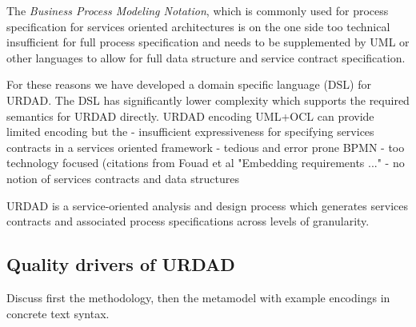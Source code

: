 The \emph{Business Process Modeling Notation}, which is commonly used for process specification for services oriented architectures is on the one side too technical \cite{} insufficient for full process specification and needs to be supplemented by UML or other languages to allow for full data structure and service contract specification.


For these reasons we have developed a domain specific language (DSL) for URDAD. The DSL has significantly lower complexity which supports the required semantics for URDAD directly. 
URDAD encoding
UML+OCL can provide limited encoding but the
  - insufficient expressiveness for specifying services contracts in a services oriented framework
  - tedious and error prone
BPMN
  - too technology focused (citations from Fouad et al "Embedding requirements ..."
  - no notion of services contracts and data structures  

URDAD is a service-oriented analysis and design process which generates services contracts and associated process specifications across levels of granularity. 

\subsection{Quality drivers of URDAD}

Discuss first the methodology, then the metamodel with example encodings in concrete text syntax.

